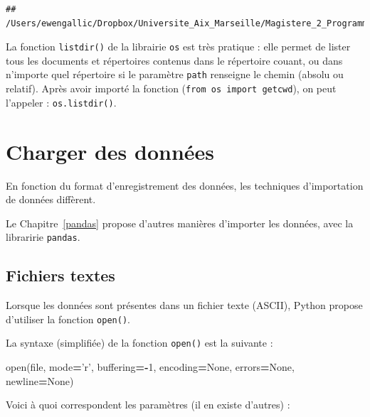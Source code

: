 \documentclass[12pt,]{book}
\newenvironment{Shaded}{\begin{snugshade}}{\end{snugshade}}
\newcommand{\DecValTok}[1]{\textcolor[rgb]{0.00,0.00,0.81}{#1}}
\newcommand{\StringTok}[1]{\textcolor[rgb]{0.31,0.60,0.02}{#1}}
\newcommand{\VariableTok}[1]{\textcolor[rgb]{0.00,0.00,0.00}{#1}}
\newcommand{\OperatorTok}[1]{\textcolor[rgb]{0.81,0.36,0.00}{\textbf{#1}}}
\newcommand{\BuiltInTok}[1]{#1}
\newcommand{\NormalTok}[1]{#1}
\numberwithin{equation}{section}
\numberwithin{countremarque}{section}
\let\BeginKnitrBlock\begin \let\EndKnitrBlock\end
\begin{document}
\begin{lstlisting}
## /Users/ewengallic/Dropbox/Universite_Aix_Marseille/Magistere_2_Programming_for_big_data/Cours/chapters/python/Python_pour_economistes
\end{lstlisting}

\BeginKnitrBlock{remarque}
La fonction \texttt{listdir()} de la librairie \texttt{os} est très
pratique : elle permet de lister tous les documents et répertoires
contenus dans le répertoire couant, ou dans n'importe quel répertoire si
le paramètre \texttt{path} renseigne le chemin (absolu ou relatif).
Après avoir importé la fonction (\texttt{from\ os\ import\ getcwd}), on
peut l'appeler : \texttt{os.listdir()}.
\EndKnitrBlock{remarque}

\section{Charger des données}\label{charger-donnees}

En fonction du format d'enregistrement des données, les techniques
d'importation de données diffèrent.

\BeginKnitrBlock{remarque}
Le Chapitre~\ref{pandas} propose d'autres manières d'importer les
données, avec la libraririe \texttt{pandas}.
\EndKnitrBlock{remarque}

\subsection{Fichiers textes}\label{import-fichiers-texte}

Lorsque les données sont présentes dans un fichier texte (ASCII), Python
propose d'utiliser la fonction \texttt{open()}.

La syntaxe (simplifiée) de la fonction \texttt{open()} est la suivante :

\begin{Shaded}
\begin{Highlighting}[]
\BuiltInTok{open}\NormalTok{(}\BuiltInTok{file}\NormalTok{, mode}\OperatorTok{=}\StringTok{'r'}\NormalTok{, buffering}\OperatorTok{=-}\DecValTok{1}\NormalTok{,}
\NormalTok{  encoding}\OperatorTok{=}\VariableTok{None}\NormalTok{, errors}\OperatorTok{=}\VariableTok{None}\NormalTok{, newline}\OperatorTok{=}\VariableTok{None}\NormalTok{)}
\end{Highlighting}
\end{Shaded}

Voici à quoi correspondent les paramètres (il en existe d'autres) :
\end{document}
